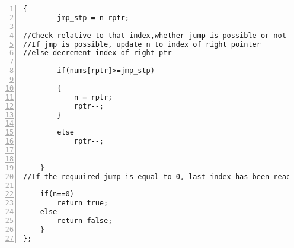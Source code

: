 \documentclass[12pt]{article}
\begin{document}
\begin{enumerate}
\begin{Verbatim}[numbers=left,xleftmargin=15mm, numbersep=10pt]
	{
		jmp_stp = n-rptr;
	
//Check relative to that index,whether jump is possible or not
//If jmp is possible, update n to index of right pointer
//else decrement index of right ptr

		if(nums[rptr]>=jmp_stp)

		{
			n = rptr;
			rptr--;
		}

		else
			rptr--;

		
	}
//If the requuired jump is equal to 0, last index has been reached.

	if(n==0)
		return true;
	else
		return false;
	}
};
\end{Verbatim}


	
	
\end{enumerate}
\end{document}
